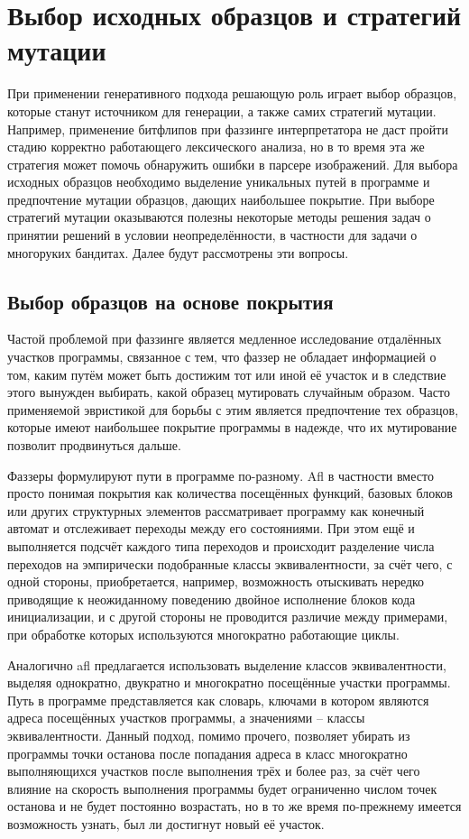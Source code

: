 \section{Выбор исходных образцов и стратегий мутации}

При применении генеративного подхода решающую роль играет выбор образцов, которые станут источником для генерации, а также самих стратегий мутации. Например, применение битфлипов при фаззинге интерпретатора не даст пройти стадию корректно работающего лексического анализа, но в то время эта же стратегия может помочь обнаружить ошибки в парсере изображений. Для выбора исходных образцов необходимо выделение уникальных путей в программе и предпочтение мутации образцов, дающих наибольшее покрытие. При выборе стратегий мутации оказываются полезны некоторые методы решения задач о принятии решений в условии неопределённости, в частности для задачи о многоруких бандитах. Далее будут рассмотрены эти вопросы.

\subsection{Выбор образцов на основе покрытия}

Частой проблемой при фаззинге является медленное исследование отдалённых участков программы, связанное с тем, что фаззер не обладает информацией о том, каким путём может быть достижим тот или иной её участок и в следствие этого вынужден выбирать, какой образец мутировать случайным образом. Часто применяемой эвристикой для борьбы с этим является предпочтение тех образцов, которые имеют наибольшее покрытие программы в надежде, что их мутирование позволит продвинуться дальше.

Фаззеры формулируют пути в программе по-разному. Afl в частности вместо просто понимая покрытия как количества посещённых функций, базовых блоков или других структурных элементов рассматривает программу как конечный автомат и отслеживает переходы между его состояниями. При этом ещё и выполняется подсчёт каждого типа переходов и происходит разделение числа переходов на эмпирически подобранные классы эквивалентности, за счёт чего, с одной стороны, приобретается, например, возможность отыскивать нередко приводящие к неожиданному поведению двойное исполнение блоков кода инициализации, и с другой стороны не проводится различие между примерами, при обработке которых используются многократно работающие циклы.

Аналогично afl предлагается использовать выделение классов эквивалентности, выделяя однократно, двукратно и многократно посещённые участки программы. Путь в программе представляется как словарь, ключами в котором являются адреса посещённых участков программы, а значениями -- классы эквивалентности. Данный подход, помимо прочего, позволяет убирать из программы точки останова после попадания адреса в класс многократно выполняющихся участков после выполнения трёх и более раз, за счёт чего влияние на скорость выполнения программы будет ограниченно числом точек останова и не будет постоянно возрастать, но в то же время по-прежнему имеется возможность узнать, был ли достигнут новый её участок.


